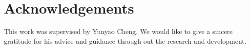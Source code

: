 \section*{Acknowledgements}
This work was supervised by Yunyao Cheng. We would like to give a sincere gratitude for his advice and guidance through out the research and development.